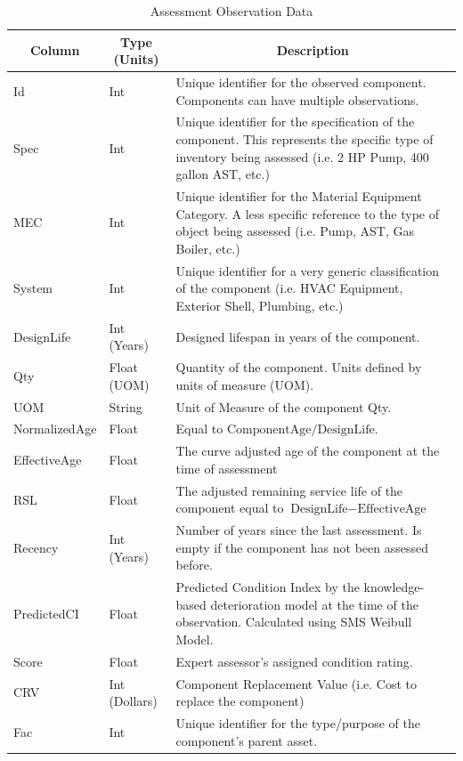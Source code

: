 \documentclass[Journal,letterpaper,NoPageNumbers,NoLineNumbers]{ascelike-new}
\begin{document}
\begin{table}
\caption{Assessment Observation Data}
\label{table:assembly}
\centering
\small
\renewcommand{\arraystretch}{1.25}
\begin{tabular}{l l p{3.2in}}
\hline\hline
\multicolumn{1}{c}{Column} &
\multicolumn{1}{c}{Type (Units)} &
\multicolumn{1}{c}{Description} \\
\hline
Id & Int & Unique identifier for the observed component. Components can have multiple observations.\\
Spec & Int & Unique identifier for the specification of the component. This represents the specific type of inventory being assessed (i.e. 2 HP Pump, 400 gallon AST, etc.) \\
MEC & Int & Unique identifier for the Material Equipment Category. A less specific reference to the type of object being assessed (i.e. Pump, AST, Gas Boiler, etc.) \\
System & Int & Unique identifier for a very generic classification of the component (i.e. HVAC Equipment, Exterior Shell, Plumbing, etc.) \\
DesignLife & Int (Years) & Designed lifespan in years of the component. \\
Qty & Float (UOM) & Quantity of the component. Units defined by units of measure (UOM). \\
UOM & String & Unit of Measure of the component Qty. \\
NormalizedAge & Float & Equal to $\text{ComponentAge} / \text{DesignLife}$. \\
EffectiveAge & Float & The curve adjusted age of the component at the time of assessment \\
RSL & Float & The adjusted remaining service life of the component equal to $\text{DesignLife} - \text{EffectiveAge}$ \\
Recency & Int (Years) & Number of years since the last assessment. Is empty if the component has not been assessed before. \\
PredictedCI & Float & Predicted Condition Index by the knowledge-based deterioration model at the time of the observation. Calculated using SMS Weibull Model. \\
Score & Float & Expert assessor's assigned condition rating. \\
CRV & Int (Dollars) & Component Replacement Value (i.e. Cost to replace the component) \\
Fac & Int & Unique identifier for the type/purpose of the component's parent asset. \\

\end{tabular}
\end{table}
\end{document}

